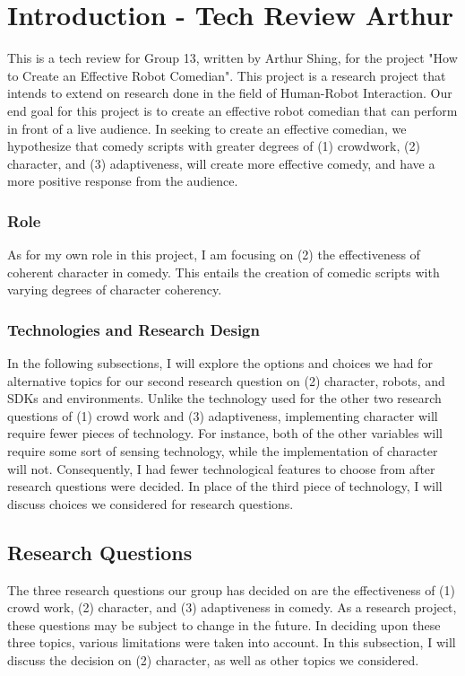 \section{Introduction - Tech Review Arthur}

This is a tech review for Group 13, written by Arthur Shing, for the project "How to Create an Effective Robot Comedian".
This project is a research project that intends to extend on research done in the field of Human-Robot Interaction.
Our end goal for this project is to create an effective robot comedian that can perform in front of a live audience.
In seeking to create an effective comedian, we hypothesize that comedy scripts with greater degrees of (1) crowdwork, (2) character, and (3) adaptiveness, will create more effective comedy, and have a more positive response from the audience.

\subsubsection{Role}
As for my own role in this project, I am focusing on (2) the effectiveness of coherent character in comedy.
This entails the creation of comedic scripts with varying degrees of character coherency.

\subsubsection{Technologies and Research Design}
In the following subsections, I will explore the options and choices we had for alternative topics for our second research question on (2) character, robots, and SDKs and environments. Unlike the technology used for the other two research questions of (1) crowd work and (3) adaptiveness, implementing character will require fewer pieces of technology. For instance, both of the other variables will require some sort of sensing technology, while the implementation of character will not. Consequently, I had fewer technological features to choose from after research questions were decided. In place of the third piece of technology, I will discuss choices we considered for research questions.


\subsection{Research Questions}
The three research questions our group has decided on are the effectiveness of (1) crowd work, (2) character, and (3) adaptiveness in comedy. As a research project, these questions may be subject to change in the future. In deciding upon these three topics, various limitations were taken into account. In this subsection, I will discuss the decision on (2) character, as well as other topics we considered.

